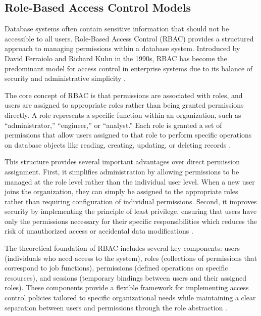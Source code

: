 \subsection{Role-Based Access Control Models}
\label{subsec:role-based-access-control}

Database systems often contain sensitive information that should not be accessible to all users. Role-Based Access Control (RBAC) provides a structured approach to managing permissions within a database system. Introduced by David Ferraiolo and Richard Kuhn in the 1990s, RBAC has become the predominant model for access control in enterprise systems due to its balance of security and administrative simplicity \cite{sandhu1998role}.

The core concept of RBAC is that permissions are associated with roles, and users are assigned to appropriate roles rather than being granted permissions directly. A role represents a specific function within an organization, such as ``administrator,'' ``engineer,'' or ``analyst.'' Each role is granted a set of permissions that allow users assigned to that role to perform specific operations on database objects like reading, creating, updating, or deleting records \cite{ferraiolo2011policy}.

This structure provides several important advantages over direct permission assignment. First, it simplifies administration by allowing permissions to be managed at the role level rather than the individual user level. When a new user joins the organization, they can simply be assigned to the appropriate roles rather than requiring configuration of individual permissions. Second, it improves security by implementing the principle of least privilege, ensuring that users have only the permissions necessary for their specific responsibilities which reduces the risk of unauthorized access or accidental data modifications \cite{sandhu1998role}.

The theoretical foundation of RBAC includes several key components: users (individuals who need access to the system), roles (collections of permissions that correspond to job functions), permissions (defined operations on specific resources), and sessions (temporary bindings between users and their assigned roles). These components provide a flexible framework for implementing access control policies tailored to specific organizational needs while maintaining a clear separation between users and permissions through the role abstraction \cite{sandhu1997arbac97}.


